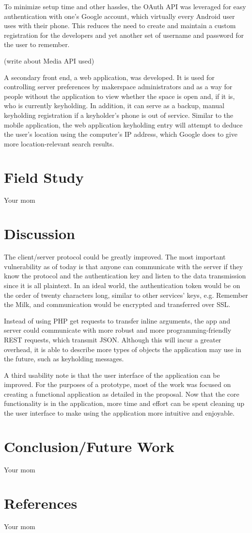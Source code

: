 \documentclass[11pt,twocolumn]{article}
\begin{document}
To minimize setup time and other hassles, the OAuth API was leveraged for easy authentication with one's Google account, which virtually every Android user uses with their phone. This reduces the need to create and maintain a custom registration for the developers and yet another set of username and password for the user to remember.

(write about Media API used)

A secondary front end, a web application, was developed. It is used for controlling server preferences by makerspace administrators and as a way for people without the application to view whether the space is open and, if it is, who is currently keyholding. In addition, it can serve as a backup, manual keyholding registration if a keyholder's phone is out of service. Similar to the mobile application, the web application keyholding entry will attempt to deduce the user's location using the computer's IP address, which Google does to give more location-relevant search results.

\section{Field Study}
Your mom

\section{Discussion}
The client/server protocol could be greatly improved. The most important vulnerability as of today is that anyone can communicate with the server if they know the protocol and the authentication key and listen to the data transmission since it is all plaintext. In an ideal world, the authentication token would be on the order of twenty characters long, similar to other services’ keys, e.g. Remember the Milk, and communication would be encrypted and transferred over SSL.

Instead of using PHP get requests to transfer inline arguments, the app and server could communicate with more robust and more programming-friendly REST requests, which transmit JSON. Although this will incur a greater overhead, it is able to describe more types of objects the application may use in the future, such as keyholding messages. 

A third usability note is that the user interface of the application can be improved. For the purposes of a prototype, most of the work was focused on creating a functional application as detailed in the proposal. Now that the core functionality is in the application, more time and effort can be spent cleaning up the user interface to make using the application more intuitive and enjoyable.

\section{Conclusion/Future Work}
Your mom

\section{References}
Your mom
\end{document}

